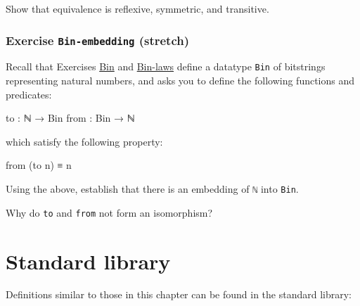 Show that equivalence is reflexive, symmetric, and transitive.

\begin{fence}
\begin{code}%
\>[0]\<%
\end{code}
\end{fence}

\hypertarget{Isomorphism-Bin-embedding}{%
\subsubsection{\texorpdfstring{Exercise \texttt{Bin-embedding}
(stretch)}{Exercise Bin-embedding (stretch)}}\label{Isomorphism-Bin-embedding}}

Recall that Exercises \protect\hyperlink{Naturals-Bin}{Bin} and
\protect\hyperlink{Induction-Bin-laws}{Bin-laws} define a datatype
\texttt{Bin} of bitstrings representing natural numbers, and asks you to
define the following functions and predicates:

\begin{myDisplay}
to : ℕ → Bin
from : Bin → ℕ
\end{myDisplay}

which satisfy the following property:

\begin{myDisplay}
from (to n) ≡ n
\end{myDisplay}

Using the above, establish that there is an embedding of \texttt{ℕ} into
\texttt{Bin}.

\begin{fence}
\begin{code}%
\>[0]\<%
\end{code}
\end{fence}

Why do \texttt{to} and \texttt{from} not form an isomorphism?

\hypertarget{standard-library}{%
\section{Standard library}\label{standard-library}}

Definitions similar to those in this chapter can be found in the
standard library:

